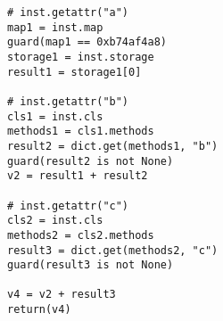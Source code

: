 \begin{Verbatim}
# inst.getattr("a")
map1 = inst.map
guard(map1 == 0xb74af4a8)
storage1 = inst.storage
result1 = storage1[0]

# inst.getattr("b")
cls1 = inst.cls
methods1 = cls1.methods
result2 = dict.get(methods1, "b")
guard(result2 is not None)
v2 = result1 + result2

# inst.getattr("c")
cls2 = inst.cls
methods2 = cls2.methods
result3 = dict.get(methods2, "c")
guard(result3 is not None)

v4 = v2 + result3
return(v4)
\end{Verbatim}
